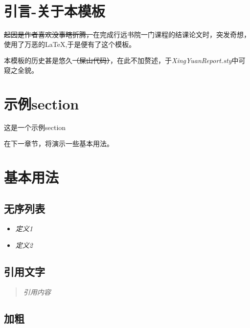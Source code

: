 \documentclass[12pt,a4paper,UTF8]{ctexart}
\begin{document}
\cover

\thispagestyle{empty} %

\newpage
\tableofcontents
\thispagestyle{empty} %

\newpage
\setcounter{page}{1} %

\section{引言-关于本模板}

\sout{起因是作者喜欢没事瞎折腾，}在完成行远书院一门课程的结课论文时，突发奇想，使用了万恶的\LaTeX ,于是便有了这个模板。

本模板的历史甚是悠久\sout{（屎山代码）}，在此不加赘述，于\textit{XingYuanReport.sty}中可窥之全貌。

\section{示例section}

这是一个示例section

在下一章节，将演示一些基本用法。

\section{基本用法}
\subsection{无序列表}
\begin{itemize}
    \item \textit{定义1}
    \item \textit{定义2}\cite{示例引用}
\end{itemize}



\subsection{引用文字}

\begin{quote}
    \textit{引用内容}\cite{示例引用}
\end{quote}

\subsection{加粗}
\end{document}
